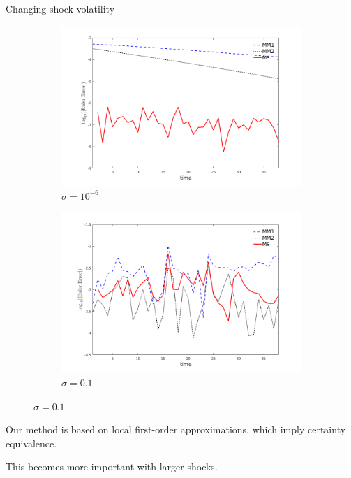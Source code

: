 \documentclass{beamer}
\begin{document}
\begin{frame}{Changing shock volatility}
    \begin{figure}[htpb]
        \centering
        \label{fig-eulererrors_2countries_changingsigma}
        \begin{subfigure}[b]{0.49\textwidth}
            \includegraphics[width=\textwidth]{two_country_sigmasmall_k0_1_5_euler_errors}
            \caption{$\sigma=10^{-6}$}
            \label{two_country_sigma_low}
        \end{subfigure}
        \begin{subfigure}[b]{0.49\textwidth}
            \includegraphics[width=\textwidth]{two_country_sigmalarge_k0_1_5_euler_errors}
            \caption{$\sigma=0.1$}
            \label{two_country_sigma_high}
        \end{subfigure}
    \end{figure} 

    \small
    Our method is based on local first-order approximations, which imply certainty equivalence.

    \medskip
    This becomes more important with larger shocks.
    
\end{frame}
\end{document}
